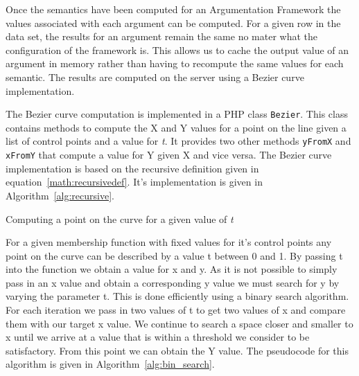 Once the semantics have been computed for an Argumentation Framework the values associated with each argument can be computed. For a given row in the data set, the results for an argument remain the same no mater what the configuration of the framework is. This allows us to cache the output value of an argument in memory rather than having to recompute the same values for each semantic. The results are computed on the server using a Bezier curve implementation. 

The Bezier curve computation is implemented in a PHP class \lstinline{Bezier}. This class contains methods to compute the X and Y values for a point on the line given a list of control points and a value for \textit{t}. It provides two other methods \lstinline{yFromX} and \lstinline{xFromY} that compute a value for Y given X and vice versa. The Bezier curve implementation is based on the recursive definition given in equation~\ref{math:recursivedef}. It's implementation is given in Algorithm~\ref{alg:recursive}.

\begin{algorithm}[H]
\label{alg:recursive}
\SetAlgoLined
{}
\caption{Computing a point on the curve for a given value of \textit{t}}
\end{algorithm}

For a given membership function with fixed values for it's control points any point on the curve can be described by a value t between 0 and 1. By passing t into the function we obtain a value for x and y. As it is not possible to simply pass in an x value and obtain a corresponding y value we must search for y by varying the parameter t. This is done efficiently using a binary search algorithm. For each iteration we pass in two values of t to get two values of x and compare them with our target x value. We continue to search a space closer and smaller to x until we arrive at a value that is within a threshold we consider to be satisfactory. From this point we can obtain the Y value. The pseudocode for this algorithm is given in Algorithm~\ref{alg:bin_search}.

